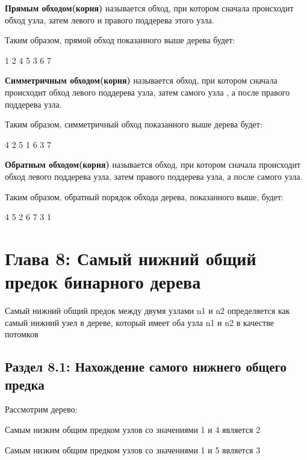 
\textbf{Прямым обходом(корня)} называется обход, при котором сначала происходит обход узла, затем левого и правого поддерева этого узла.

\vspace{\baselineskip}
Таким образом, прямой обход показанного выше дерева будет:

\vspace{\baselineskip}
1 2 4 5 3 6 7

\vspace{\baselineskip}
\textbf{Симметричным обходом(корня)} называется обход, при котором сначала происходит обход левого поддерева узла, затем самого узла , а после  правого поддерева узла.

\vspace{\baselineskip}
Таким образом, симметричный обход показанного выше дерева будет:

\vspace{\baselineskip}
4 2 5 1 6 3 7

\vspace{\baselineskip}
\textbf{Обратным обходом(корня)} называется обход, при котором сначала происходит обход левого поддерева узла, затем правого поддерева узла, а после самого узла.

\vspace{\baselineskip}
Таким образом, обратный порядок обхода дерева, показанного выше, будет:

\vspace{\baselineskip}
4 5 2 6 7 3 1

\chapter*{Глава 8: Самый нижний общий предок бинарного дерева}
\vspace{-0.4cm}
Самый нижний общий предок между двумя узлами n1 и n2 определяется как самый нижний узел в дереве, который имеет оба узла n1 и n2 в качестве потомков

\section*{Раздел 8.1: Нахождение самого нижнего общего предка}
Рассмотрим дерево:


Самым низким общим предком  узлов со значениями 1 и 4 является 2

\vspace{\baselineskip}
Самым низким общим предком  узлов со значениями 1 и 5 является 3

